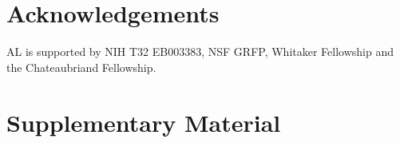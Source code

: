 \documentclass{article}
\theoremstyle{definition}
\theoremstyle{remark}
\newcommand{\beginsupplement}{%
        \setcounter{table}{0}
        \renewcommand{\thetable}{S\arabic{table}}%
        \setcounter{figure}{0}
        \renewcommand{\thefigure}{S\arabic{figure}}%
     }
\begin{document}
\section{Acknowledgements}
  
  AL is supported by NIH T32 EB003383, NSF GRFP, Whitaker Fellowship and the Chateaubriand Fellowship. 

\newpage
\section{Supplementary Material}
\beginsupplement
  
\clearpage
\newpage
  
\end{document}
